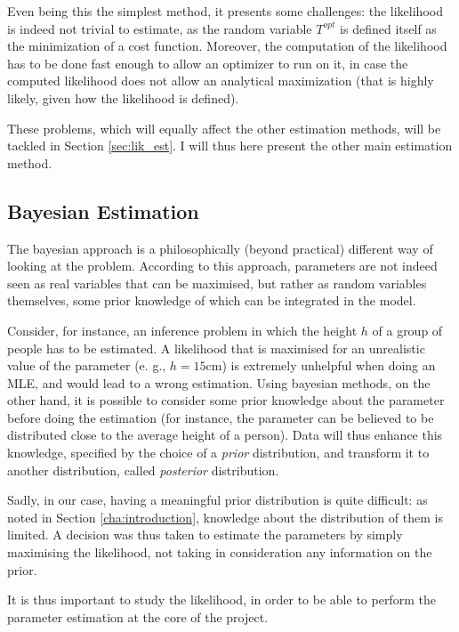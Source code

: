 Even being this the simplest method, it presents some challenges:
the likelihood is indeed not trivial to estimate,
as the random variable \(T^{opt}\) is defined itself as the minimization of a cost function.
Moreover, the computation of the likelihood has to be done fast enough to allow an optimizer to run on it,
in case the computed likelihood does not allow an analytical maximization (that is highly likely,
given how the likelihood is defined).

These problems, which will equally affect the other estimation methods,
will be tackled in Section \ref{sec:lik_est}.
I will thus here present the other main estimation method.

\subsection{Bayesian Estimation}
\label{sec:bayes}

The bayesian approach is a philosophically (beyond practical) different way of looking at the problem.
According to this approach, parameters are not indeed seen as real variables that can be maximised,
but rather as random variables themselves,
some prior knowledge of which can be integrated in the model.

Consider, for instance, an inference problem in which
the height \(h\) of a group of people has to be estimated.
A likelihood that is maximised for an unrealistic value of the parameter (e. g., \(h = 15 \unit{\cm}\)) is extremely unhelpful when doing an MLE,
and would lead to a wrong estimation.
Using bayesian methods, on the other hand,
it is possible to consider some prior knowledge about the parameter before doing the estimation
(for instance, the parameter can be believed to be distributed close to the average height of a person).
Data will thus enhance this knowledge,
specified by the choice of a \textit{prior} distribution,
and transform it to another distribution, called \textit{posterior} distribution.

Sadly, in our case, having a meaningful prior distribution is quite difficult:
as noted in Section \ref{cha:introduction},
knowledge about the distribution of them is limited.
A decision was thus taken to estimate the parameters by simply maximising the likelihood,
not taking in consideration any information on the prior.

It is thus important to study the likelihood,
in order to be able to perform the parameter estimation at the core of the project.

